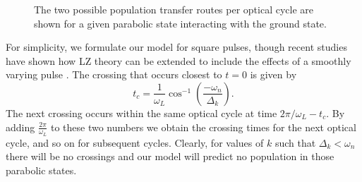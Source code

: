 \begin{figure}[tbp]
\bigskip
{} {The two possible
population transfer routes per optical cycle are shown for a given parabolic
state interacting with the ground state.
\label{lz2}}
\end{figure}

For simplicity, we formulate our model for square pulses, though recent studies
have shown how LZ theory can be extended to include the effects of a smoothly
varying pulse \cite{Vitanov:96}.  The crossing that occurs closest to
$t=0$ is given by
\begin{equation}
t_c = \frac{1}{\omega_L}\cos^{-1}(\frac{-\omega_n}{\Delta_k}).
\label{tc}
\end{equation}
The next crossing occurs within the same optical cycle at time $2
\pi/\omega_L- t_c$. By adding $\frac{2\pi}{\omega_L}$ to these two numbers we
obtain the crossing times for the next optical cycle, and so on for subsequent
cycles.  Clearly, for values of $k$ such that $\Delta_k <
\omega_n$ there will be no crossings and our model will predict no
population in those parabolic states.

